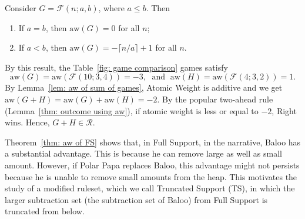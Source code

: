 \documentclass[oneside,reqno]{amsart}
\newcommand{\fs}{\mathcal{F}}
\newcommand{\aw}{\mathrm{aw}}
\newcommand{\rp}{\mathscr{R}}
\begin{document}
\begin{theorem}\label{thm: aw of FS}
    Consider $G=\fs(n;a,b)$, where $a\le b$. Then 
    \begin{enumerate}
        \item If $a=b$, then $\aw(G)=0$ for all $n$;
        \item If $a<b$, then $\aw(G)=-\lceil n/a\rceil +1$ for all $n$.
    \end{enumerate}
\end{theorem}

By this result, the Table~\ref{fig: game comparison} games satisfy \[\aw(G)=\aw(\fs(10;3,4))=-3, \;\text{ and  }\; \aw(H)=\aw(\fs(4;3,2))=1.\] 
By Lemma~\ref{lem: aw of sum of games}, Atomic Weight is additive and we get $\aw(G+H)=\aw(G)+\aw(H)=-2$. By the popular two-ahead rule (Lemma~\ref{thm: outcome using aw}), if atomic weight is less or equal to $-2$, Right wins. Hence, $G+H\in \rp$.


Theorem~\ref{thm: aw of FS} shows that, in {\sc Full Support}, in the narrative, Baloo has a substantial advantage. This is because he can remove large as well as small amount. However, if Polar Papa replaces Baloo, this advantage might not persists because he is unable to remove small amounts from the heap. This motivates the study of a modified ruleset, which we call {\sc Truncated Support (TS)}, in which the larger subtraction set (the subtraction set of Baloo) from {\sc Full Support} is truncated from below.
\end{document}
